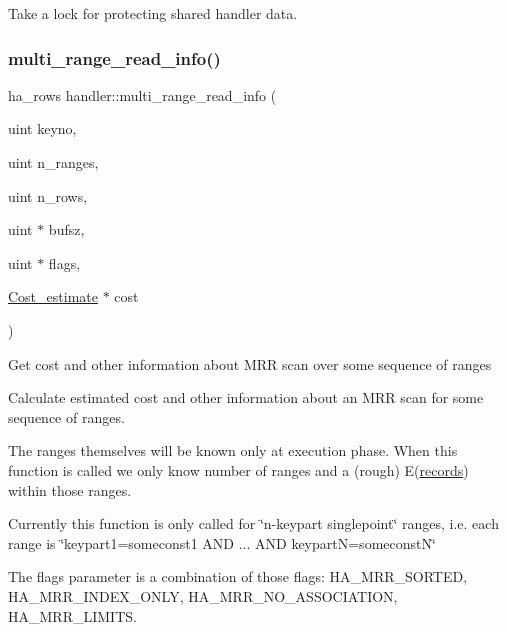 Take a lock for protecting shared handler data. \mbox{\label{classhandler_a5add40a6cd7088ffef25a3816294b624}} 
\subsubsection{\texorpdfstring{multi\+\_\+range\+\_\+read\+\_\+info()}{multi\_range\_read\_info()}}
{\footnotesize\ttfamily ha\+\_\+rows handler\+::multi\+\_\+range\+\_\+read\+\_\+info (\begin{DoxyParamCaption}\item[{uint}]{keyno,  }\item[{uint}]{n\+\_\+ranges,  }\item[{uint}]{n\+\_\+rows,  }\item[{uint $\ast$}]{bufsz,  }\item[{uint $\ast$}]{flags,  }\item[{\mbox{\hyperlink{classCost__estimate}{Cost\+\_\+estimate}} $\ast$}]{cost }\end{DoxyParamCaption})\hspace{0.3cm}{\ttfamily [virtual]}}

Get cost and other information about M\+RR scan over some sequence of ranges

Calculate estimated cost and other information about an M\+RR scan for some sequence of ranges.

The ranges themselves will be known only at execution phase. When this function is called we only know number of ranges and a (rough) E(\mbox{\hyperlink{classhandler_ae5b7b96354fd25da35a940e656d91940}{records}}) within those ranges.

Currently this function is only called for \char`\"{}n-\/keypart singlepoint\char`\"{} ranges, i.\+e. each range is \char`\"{}keypart1=someconst1 A\+N\+D ... A\+N\+D keypart\+N=someconst\+N\char`\"{}

The flags parameter is a combination of those flags\+: H\+A\+\_\+\+M\+R\+R\+\_\+\+S\+O\+R\+T\+ED, H\+A\+\_\+\+M\+R\+R\+\_\+\+I\+N\+D\+E\+X\+\_\+\+O\+N\+LY, H\+A\+\_\+\+M\+R\+R\+\_\+\+N\+O\+\_\+\+A\+S\+S\+O\+C\+I\+A\+T\+I\+ON, H\+A\+\_\+\+M\+R\+R\+\_\+\+L\+I\+M\+I\+TS.


